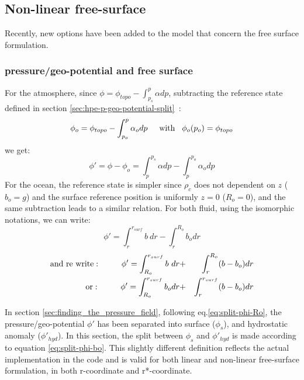 


\subsection{Non-linear free-surface}
\label{sect:nonlinear-freesurface}

Recently, new options have been added to the model
that concern the free surface formulation.


\subsubsection{pressure/geo-potential and free surface}

For the atmosphere, since $\phi = \phi_{topo} - \int^p_{p_s} \alpha dp$,
subtracting the reference state defined in section
\ref{sec:hpe-p-geo-potential-split}~:\\
$$
\phi_o = \phi_{topo} - \int^p_{p_o} \alpha_o dp  
\hspace{5mm}\mathrm{with}\hspace{3mm} \phi_o(p_o)=\phi_{topo}
$$
we get:
$$
\phi' = \phi - \phi_o = \int^{p_s}_p \alpha dp - \int^{p_o}_p \alpha_o dp
$$
For the ocean, the reference state is simpler since $\rho_c$ does not dependent
on $z$ ($b_o=g$) and the surface reference position is uniformly $z=0$ ($R_o=0$),
and the same subtraction leads to a similar relation.
For both fluid, using the isomorphic notations, we can write:
$$ 
\phi' = \int^{r_{surf}}_r b~ dr - \int^{R_o}_r b_o dr
$$
\begin{eqnarray}
\mathrm{and~re~write:}\hspace{10mm}
\phi' = \int^{r_{surf}}_{R_o} b~ dr & + & \int^{R_o}_r (b - b_o) dr
\label{eq:split-phi-Ro} \\ 
\mathrm{or:}\hspace{10mm}
\phi' = \int^{r_{surf}}_{R_o} b_o dr & + & \int^{r_{surf}}_r (b - b_o) dr
\label{eq:split-phi-bo}
\end{eqnarray}

In section \ref{sec:finding_the_pressure_field}, following eq.\ref{eq:split-phi-Ro},
the pressure/geo-potential $\phi'$ has been separated into surface ($\phi_s$),
and hydrostatic anomaly ($\phi'_{hyd}$).
In this section, the split between $\phi_s$ and $\phi'_{hyd}$ is 
made according to equation \ref{eq:split-phi-bo}. This slightly
different definition reflects the actual implementation in the code 
and is valid for both linear and non-linear
free-surface formulation, in both r-coordinate and r*-coordinate.

